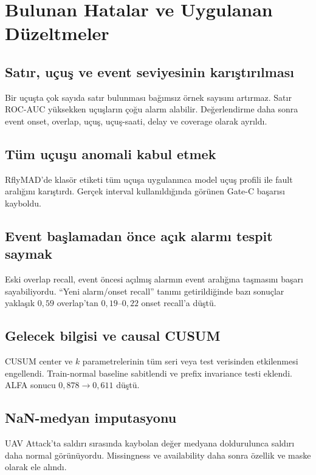 \documentclass[11pt,a4paper,oneside]{report}
\newcommand{\code}[1]{\texttt{\detokenize{#1}}}
\begin{document}
\chapter{Bulunan Hatalar ve Uygulanan Düzeltmeler}

\section{Satır, uçuş ve event seviyesinin karıştırılması}

Bir uçuşta çok sayıda satır bulunması bağımsız örnek sayısını artırmaz.
Satır ROC-AUC yüksekken uçuşların çoğu alarm alabilir. Değerlendirme daha
sonra event onset, overlap, uçuş, uçuş-saati, delay ve coverage olarak
ayrıldı.

\section{Tüm uçuşu anomali kabul etmek}

RflyMAD'de klasör etiketi tüm uçuşa uygulanınca model uçuş profili ile fault
aralığını karıştırdı. Gerçek interval kullanıldığında görünen Gate-C başarısı
kayboldu.

\section{Event başlamadan önce açık alarmı tespit saymak}

Eski overlap recall, event öncesi açılmış alarmın event aralığına taşmasını
başarı sayabiliyordu. ``Yeni alarm/onset recall'' tanımı getirildiğinde bazı
sonuçlar yaklaşık \(0{,}59\) overlap'tan \(0{,}19\)--\(0{,}22\) onset
recall'a düştü.

\section{Gelecek bilgisi ve causal CUSUM}

CUSUM center ve \(k\) parametrelerinin tüm seri veya test verisinden
etkilenmesi engellendi. Train-normal baseline sabitlendi ve prefix
invariance testi eklendi. ALFA \code{alt_error_cusum} sonucu
\(0{,}878\to0{,}611\) düştü.

\section{NaN-medyan imputasyonu}

UAV Attack'ta saldırı sırasında kaybolan değer medyana doldurulunca saldırı
daha normal görünüyordu. Missingness ve availability daha sonra özellik ve
maske olarak ele alındı.
\end{document}

